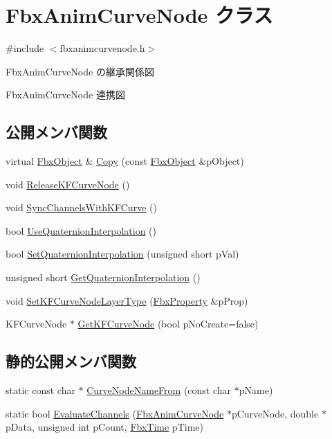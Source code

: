 \hypertarget{class_fbx_anim_curve_node}{}\section{Fbx\+Anim\+Curve\+Node クラス}
\label{class_fbx_anim_curve_node}


{\ttfamily \#include $<$fbxanimcurvenode.\+h$>$}



Fbx\+Anim\+Curve\+Node の継承関係図


Fbx\+Anim\+Curve\+Node 連携図
\subsection*{公開メンバ関数}
\begin{DoxyCompactItemize}
\item 
virtual \hyperlink{class_fbx_object}{Fbx\+Object} \& \hyperlink{class_fbx_anim_curve_node_a9630a96fb6927737ff49d6dab352c36f}{Copy} (const \hyperlink{class_fbx_object}{Fbx\+Object} \&p\+Object)
\item 
void \hyperlink{class_fbx_anim_curve_node_ad38a2414969d07dd7c1905fb8d07a9b5}{Release\+K\+F\+Curve\+Node} ()
\item 
void \hyperlink{class_fbx_anim_curve_node_aa52265be388b803f8880e1911e211236}{Sync\+Channels\+With\+K\+F\+Curve} ()
\item 
bool \hyperlink{class_fbx_anim_curve_node_a431f4ad514b9c72efc78c1f16dc50b6b}{Use\+Quaternion\+Interpolation} ()
\item 
bool \hyperlink{class_fbx_anim_curve_node_a16fee78283fbd1d530e1e80a2bcb166a}{Set\+Quaternion\+Interpolation} (unsigned short p\+Val)
\item 
unsigned short \hyperlink{class_fbx_anim_curve_node_aef47daaf7f219b58537fcd4e40adee38}{Get\+Quaternion\+Interpolation} ()
\item 
void \hyperlink{class_fbx_anim_curve_node_a9d266fe30162053141dd131a1005abf2}{Set\+K\+F\+Curve\+Node\+Layer\+Type} (\hyperlink{class_fbx_property}{Fbx\+Property} \&p\+Prop)
\item 
K\+F\+Curve\+Node $\ast$ \hyperlink{class_fbx_anim_curve_node_a482d23e7517db05af3252b2c02ce2415}{Get\+K\+F\+Curve\+Node} (bool p\+No\+Create=false)
\end{DoxyCompactItemize}
\subsection*{静的公開メンバ関数}
\begin{DoxyCompactItemize}
\item 
static const char $\ast$ \hyperlink{class_fbx_anim_curve_node_ae75e53bb5e39cdefcd59e15e23924a13}{Curve\+Node\+Name\+From} (const char $\ast$p\+Name)
\item 
static bool \hyperlink{class_fbx_anim_curve_node_a114170d034199d8a40ccc037c495aa04}{Evaluate\+Channels} (\hyperlink{class_fbx_anim_curve_node}{Fbx\+Anim\+Curve\+Node} $\ast$p\+Curve\+Node, double $\ast$p\+Data, unsigned int p\+Count, \hyperlink{class_fbx_time}{Fbx\+Time} p\+Time)
\end{DoxyCompactItemize}
